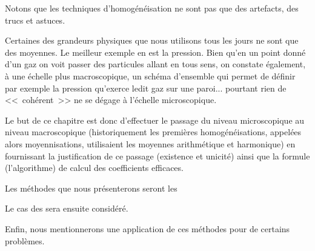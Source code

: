 \medskip{}
Notons que les techniques d'homogénéisation ne sont pas que des artefacts,
des trucs et astuces.

Certaines des grandeurs physiques que nous utilisons tous les jours ne
sont que des moyennes.
Le meilleur exemple en est la pression.
Bien qu'en un point donné d'un gaz on voit passer des particules allant en
tous sens, on constate également, à une échelle plus macroscopique,
un schéma d'ensemble qui permet de définir par exemple la pression
qu'exerce ledit gaz sur une paroi... pourtant rien de <<~cohérent~>>
ne se dégage à l'échelle microscopique.

\medskip
Le but de ce chapitre est donc d'effectuer le passage du niveau microscopique au
niveau macroscopique (historiquement les premières homogénéisations,
appelées alors moyennisations, utilisaient les moyennes arithmétique
et harmonique) en fournissant la justification de ce passage (existence et unicité)
ainsi que la formule (l'algorithme) de calcul des coefficients efficaces.

\medskip
Les méthodes que nous présenterons seront les 

Le cas des  sera ensuite considéré.

Enfin, nous mentionnerons une application de ces méthodes pour 
de certains problèmes.


\medskip
